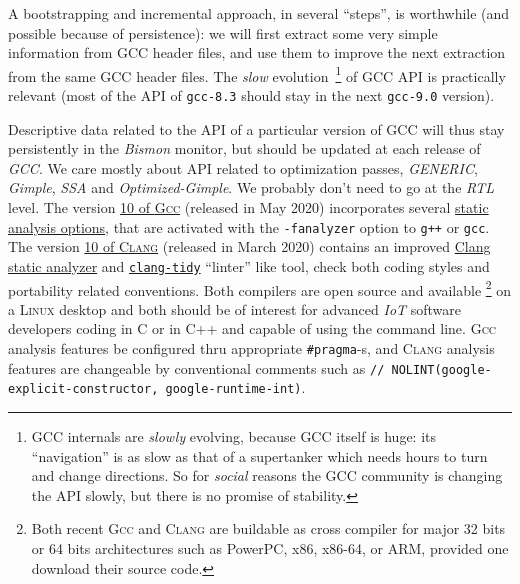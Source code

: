 A bootstrapping and incremental approach, in several ``steps'', is
worthwhile (and possible because of persistence): we will first
extract some very simple information from GCC header files, and use
them to improve the next extraction from the same GCC header
files. The \emph{slow} evolution~\footnote{GCC internals are
  \emph{slowly} evolving, because GCC itself is huge: its
  ``navigation'' is as slow as that of a supertanker which needs hours
  to turn and change directions. So for \emph{social} reasons the GCC
  community is changing the API slowly, but there is no promise of
  stability.}  of GCC API is practically relevant (most of the API of
\texttt{gcc-8.3} should stay in the next \texttt{gcc-9.0} version).

Descriptive data related to the API of a particular version of GCC
will thus stay persistently in the \emph{Bismon} monitor, but should
be updated at each release of \emph{GCC}. We care mostly about API
related to optimization passes, \emph{GENERIC}, \emph{Gimple},
\emph{SSA} and \emph{Optimized-Gimple}. We probably don't need to go
at the \emph{RTL} level. The version
\href{https://gcc.gnu.org/gcc-10/}{10 of \textsc{Gcc}} (released in
May 2020) incorporates several
\href{https://gcc.gnu.org/onlinedocs/gcc/Static-Analyzer-Options.html}{static
  analysis options}, that are activated with the \texttt{-fanalyzer}
option to \texttt{g++} or \texttt{gcc}. The version
\href{http://lists.llvm.org/pipermail/llvm-announce/2020-March/000087.html}{10
  of \textsc{Clang}} (released in March 2020) contains an improved
\href{https://clang-analyzer.llvm.org/}{Clang static analyzer} and
\href{https://clang.llvm.org/extra/clang-tidy/}{\texttt{clang-tidy}}
``linter'' like tool, check both coding styles and portability
related conventions. Both compilers are open source and available
\footnote{Both recent \textsc{Gcc} and \textsc{Clang} are buildable as
cross compiler for major 32 bits or 64 bits architectures such as
PowerPC, x86, x86-64, or ARM, provided one download their source
code.} on a \textsc{Linux} desktop and both should be of interest for
advanced \emph{IoT} software developers coding in C or in C++ and
capable of using the command line. \textsc{Gcc} analysis features be
configured thru appropriate \texttt{\#pragma}-s, and \textsc{Clang}
analysis features are changeable by conventional comments such as
\texttt{// NOLINT(google-explicit-constructor, google-runtime-int)}.




